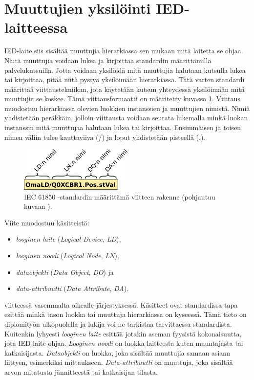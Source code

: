\section{Muuttujien yksilöinti IED-laitteessa}
IED-laite siis sisältää muuttujia hierarkiassa sen mukaan mitä laitetta se ohjaa. Näitä muuttujia voidaan lukea ja kirjoittaa standardin määrittämillä palvelukutsuilla. Jotta voidaan yksilöidä mitä muuttujia halutaan kutsulla lukea tai kirjoittaa, pitää niitä pystyä yksilöimään hierarkiassa. Tätä varten standardi määrittää viittaustekniikan, jota käytetään kutsun yhteydessä yksilöimään mitä muuttujia se koskee. Tämä viittausformaatti on määritetty kuvassa \ref{fig:iec61850-data-reference}. Viittaus muodostuu hierarkiassa olevien luokkien instanssien ja muuttujien nimistä. Nimiä yhdistetään peräkkäin, jolloin viittausta voidaan seurata lukemalla minkä luokan instanssin mitä muuttujaa halutaan lukea tai kirjoittaa. Ensimmäisen ja toisen nimen väliin tulee kauttaviiva (/) ja loput yhdistetään pisteellä (.). \mbox{\cite[s.~625--626]{Mackiewicz2006}} \mbox{\cite[s.~93--95]{IEC61850-7-1}}

\begin{figure}[ht!]
	\includegraphics[width=0.5\textwidth]{pictures/iec61850-data-reference.png}
	\caption{IEC 61850 -standardin määrittämä viitteen rakenne (pohjautuu kuvaan \mbox{\cite[s.~93]{IEC61850-7-1}}).}
	\label{fig:iec61850-data-reference}
\end{figure}

Viite muodostuu käsitteistä:
\begin{itemize}
	\item \emph{looginen laite} (\emph{Logical Device}, \emph{LD}),
	\item \emph{looginen noodi} (\emph{Logical Node}, \emph{LN}),
	\item \emph{dataobjekti} (\emph{Data Object}, \emph{DO}) ja
	\item \emph{data-attribuutti} (\emph{Data Attribute}, \emph{DA}).
\end{itemize}
viitteessä vasemmalta oikealle järjestyksessä. Käsitteet ovat standardissa tapa esittää minkä tason luokka tai muuttuja hierarkiassa on kyseessä. Tämä tieto on diplomityön ulkopuolella ja lukija voi ne tarkistaa tarvittaessa standardista. Kuitenkin lyhyesti \emph{looginen laite} esittää jotakin aseman fyysistä kokonaisuutta, jota IED-laite ohjaa. \emph{Looginen noodi} on luokka laitteesta kuten muuntajasta tai katkaisijasta. \emph{Dataobjekti} on luokka, joka sisältää muuttujia samaan asiaan liittyen, esimerkiksi mittaukseen. \emph{Data-attribuutti} on muuttuja, joka sisältää arvon mitatusta jännitteestä tai katkaisijan tilasta. \mbox{\cite[s.~2]{Camachi2017}} \mbox{\cite[s.~24]{IEC61850-1}}


